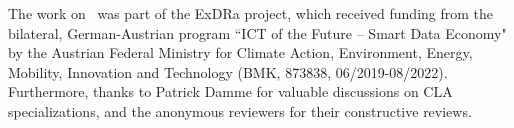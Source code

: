 
\begin{acks}
The work on \name\ was part of the ExDRa project, which received funding from the bilateral, German-Austrian program ``ICT of the Future -- Smart Data Economy" by the Austrian Federal Ministry for Climate Action, Environment, Energy, Mobility, Innovation and Technology (BMK, 873838, 06/2019-08/2022). 
Furthermore, thanks to Patrick Damme for valuable discussions on CLA specializations, and the anonymous reviewers for their constructive reviews.
\end{acks}